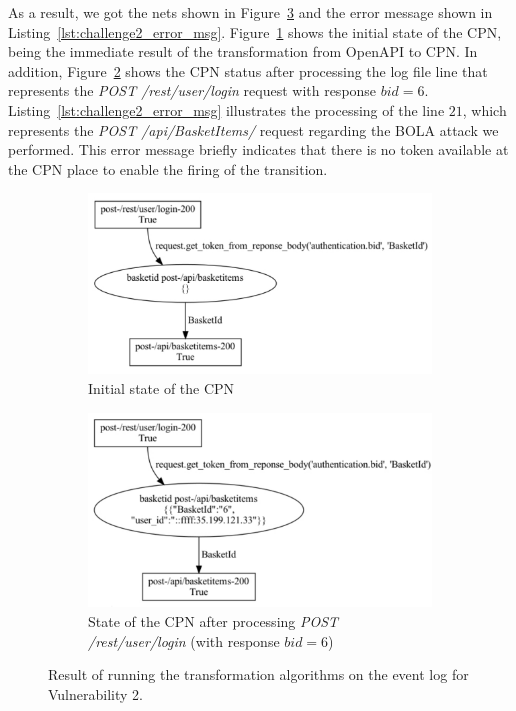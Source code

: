 As a result, we got the nets shown in Figure~\ref{fig:Juice_Shop_output_challenge2}  and the error message shown in Listing~\ref{lst:challenge2_error_msg}. Figure~\ref{fig:Juice_Shop_output_challenge2_a} shows the initial state of the CPN, being the immediate result of the transformation from OpenAPI to CPN. In addition, Figure~\ref{fig:Juice_Shop_output_challenge2_b} shows the CPN status after processing the log file line that represents the \textit{POST /rest/user/login} request with response $bid=6$. Listing~\ref{lst:challenge2_error_msg} illustrates the processing of the line $21$, which represents the \textit{POST /api/BasketItems/} request regarding the BOLA attack we performed. This error message briefly indicates that there is no token available at the CPN place to enable the firing of the transition.


\begin{figure}
    \centering
    \begin{subfigure}[b]{0.49\textwidth}
        \includegraphics[width=\textwidth]{figures/Juice_Shop_output_challenge2_a}
        \caption{Initial state of the CPN}
        \label{fig:Juice_Shop_output_challenge2_a}
    \end{subfigure}
    \begin{subfigure}[b]{0.49\textwidth}
        \includegraphics[width=\textwidth]{figures/Juice_Shop_output_challenge2_b}
        \caption{State of the CPN after processing \textit{POST /rest/user/login} (with response $bid=6$)}
        \label{fig:Juice_Shop_output_challenge2_b}
    \end{subfigure}
    \caption{Result of running the transformation algorithms on the event log for {\sc Vulnerability 2}.}
    \label{fig:Juice_Shop_output_challenge2}
\end{figure}


